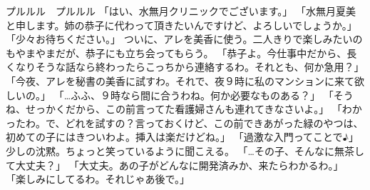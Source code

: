 プルルル　プルルル
「はい、水無月クリニックでございます。」
「水無月夏美と申します。姉の恭子に代わって頂きたいんですけど、よろしいでしょうか。」
「少々お待ちください。」
ついに、アレを美香に使う。二人きりで楽しみたいのもやまやまだが、恭子にも立ち会ってもらう。
「恭子よ。今仕事中だから、長くなりそうな話なら終わったらこっちから連絡するわ。それとも、何か急用？」
「今夜、アレを秘書の美香に試すわ。それで、夜９時に私のマンションに来て欲しいの。」
「…ふふ、９時なら間に合うわね。何か必要なものある？」
「そうね、せっかくだから、この前言ってた看護婦さんも連れてきなさいよ。」
「わかったわ。で、どれを試すの？言っておくけど、この前できあがった緑のやつは、初めての子にはきついわよ。挿入は楽だけどね。」
「過激な入門ってことで♪」
少しの沈黙。ちょっと笑っているように聞こえる。
「…その子、そんなに無茶して大丈夫？」
「大丈夫。あの子がどんなに開発済みか、来たらわかるわ。」
「楽しみにしてるわ。それじゃあ後で。」

